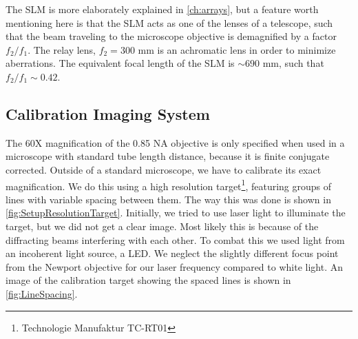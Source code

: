 The SLM is more elaborately explained in \cref{ch:arrays}, but a feature worth mentioning here is that the SLM acts as one of the lenses of a telescope, such that the beam traveling to the microscope objective is demagnified by a factor $f_2/f_1$.
The relay lens, $f_2=300$ mm is an achromatic lens in order to minimize aberrations.
The equivalent focal length of the SLM is $\sim 690$ mm, such that $f_2/f_1 \sim 0.42$.


\subsection{Calibration Imaging System}\label{subsec:CameraCalibration}

The 60X magnification of the 0.85 NA objective is only specified when used in a microscope with standard tube length distance, because it is finite conjugate corrected.
Outside of a standard microscope, we have to calibrate its exact magnification.
We do this using a high resolution target\footnote{Technologie Manufaktur TC-RT01}, featuring groups of lines with variable spacing between them. 
The way this was done is shown in \cref{fig:SetupResolutionTarget}.
Initially, we tried to use laser light to illuminate the target, but we did not get a clear image. 
Most likely this is because of the diffracting beams interfering with each other. 
To combat this we used light from an incoherent light source, a \ac{LED}. 
We neglect the slightly different focus point from the Newport objective for our laser frequency compared to white light. 
An image of the calibration target showing the spaced lines is shown in \cref{fig:LineSpacing}.

